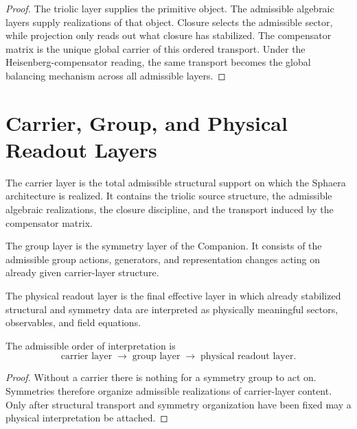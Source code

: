 \begin{proof}
The triolic layer supplies the primitive object. The admissible algebraic
layers supply realizations of that object. Closure selects the admissible
sector, while projection only reads out what closure has stabilized. The
compensator matrix is the unique global carrier of this ordered transport.
Under the Heisenberg-compensator reading, the same transport becomes the
global balancing mechanism across all admissible layers.
\end{proof}

\section{Carrier, Group, and Physical Readout Layers}
\label{sec:carrier-group-readout}

\begin{definition}
The carrier layer is the total admissible structural support on which the
Sphaera architecture is realized. It contains the triolic source structure,
the admissible algebraic realizations, the closure discipline, and the
transport induced by the compensator matrix.
\end{definition}

\begin{definition}
The group layer is the symmetry layer of the Companion. It consists of the
admissible group actions, generators, and representation changes acting on
already given carrier-layer structure.
\end{definition}

\begin{definition}
The physical readout layer is the final effective layer in which already
stabilized structural and symmetry data are interpreted as physically
meaningful sectors, observables, and field equations.
\end{definition}

\begin{theorem}
\label{thm:carrier-group-readout-order}
The admissible order of interpretation is
\[
\text{carrier layer}
\;\longrightarrow\;
\text{group layer}
\;\longrightarrow\;
\text{physical readout layer}.
\]
\end{theorem}

\begin{proof}
Without a carrier there is nothing for a symmetry group to act on. Symmetries
therefore organize admissible realizations of carrier-layer content. Only
after structural transport and symmetry organization have been fixed may a
physical interpretation be attached.
\end{proof}

